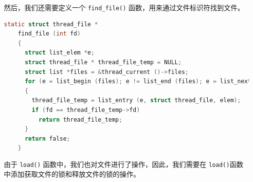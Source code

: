 \documentclass{article}
\begin{document}
然后，我们还需要定义一个 \texttt{find\_file()} 函数，用来通过文件标识符找到文件。

\begin{lstlisting}[language=C, title=\texttt{src/userprog/syscall.c - find\_file()}]
    static struct thread_file * 
    find_file (int fd)
    {
      struct list_elem *e;
      struct thread_file * thread_file_temp = NULL;
      struct list *files = &thread_current ()->files;
      for (e = list_begin (files); e != list_end (files); e = list_next (e))
      {
        thread_file_temp = list_entry (e, struct thread_file, elem);
        if (fd == thread_file_temp->fd)
          return thread_file_temp;
      }
      return false;
    }
\end{lstlisting}

由于 \texttt{load()} 函数中，我们也对文件进行了操作，因此，我们需要在 \texttt{load()}函数中添加获取文件的锁和释放文件的锁的操作。
\end{document}
